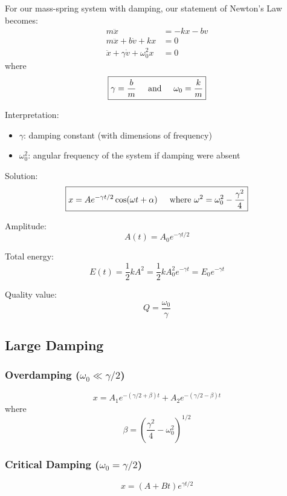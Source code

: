 For our mass-spring system with damping, our statement of Newton's Law becomes:
\begin{align*}
	m\ddot{x} &= -kx - bv \\
	m\ddot{x} + b\dot{v} + kx &= 0 \\
	\ddot{x} + \gamma \dot{v} + \omega_0^2 x &= 0
\end{align*}
where
\[ \boxed{\gamma = \frac{b}{m} \hspace{0.5cm}\text{and}\hspace{0.5cm} \omega_0 = \frac{k}{m}} \]

Interpretation:
\begin{itemize}
	\item $\gamma$: damping constant (with dimensions of frequency)
	\item $\omega_0^2$: angular frequency of the system if damping were absent
\end{itemize}

Solution:
\[
\boxed{ x = A e^{-\gamma t/2} \cos(\omega t + \alpha) \hspace{0.5cm}\text{where } \omega ^2 = \omega_0^2 - \frac{\gamma^2}{4} }
\]

Amplitude:
\[ A(t) = A_0 e^{-\gamma t/2} \]

Total energy:
\[ E(t) = \frac{1}{2}kA^2 = \frac{1}{2}kA_0^2 e^{-\gamma t} = E_0 e^{-\gamma t} \]

Quality value:
\[ Q = \frac{\omega_0}{\gamma} \]

\subsection{Large Damping}
\subsubsection{Overdamping ($ \omega_0 \ll \gamma/2 $)}
\[ x = A_1 e^{-(\gamma/2 + \beta)t} + A_2 e^{-(\gamma/2-\beta)t} \]
where \[ \beta = \left(\frac{\gamma^2}{4}-\omega_0^2 \right)^{1/2} \]

\subsubsection{Critical Damping ($ \omega_0 = \gamma/2 $)}
\[ x = (A + Bt) e^{\gamma t/2}\]